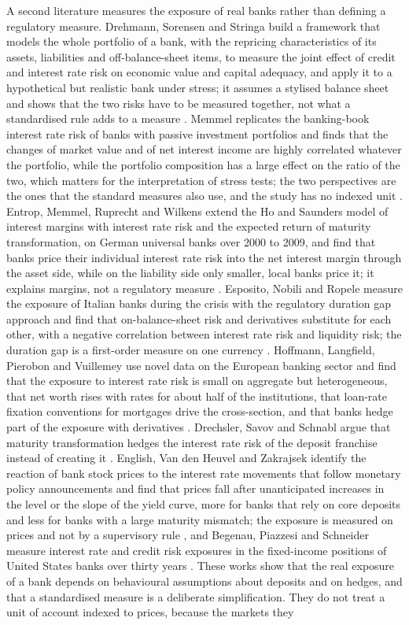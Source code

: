 A second literature measures the exposure of real banks rather than defining a regulatory measure. Drehmann, Sorensen and Stringa build a framework that models the whole portfolio of a bank, with the repricing characteristics of its assets, liabilities and off-balance-sheet items, to measure the joint effect of credit and interest rate risk on economic value and capital adequacy, and apply it to a hypothetical but realistic bank under stress; it assumes a stylised balance sheet and shows that the two risks have to be measured together, not what a standardised rule adds to a measure \citep{Drehmann2010}. Memmel replicates the banking-book interest rate risk of banks with passive investment portfolios and finds that the changes of market value and of net interest income are highly correlated whatever the portfolio, while the portfolio composition has a large effect on the ratio of the two, which matters for the interpretation of stress tests; the two perspectives are the ones that the standard measures also use, and the study has no indexed unit \citep{Memmel2011}. Entrop, Memmel, Ruprecht and Wilkens extend the Ho and Saunders model of interest margins with interest rate risk and the expected return of maturity transformation, on German universal banks over 2000 to 2009, and find that banks price their individual interest rate risk into the net interest margin through the asset side, while on the liability side only smaller, local banks price it; it explains margins, not a regulatory measure \citep{Entrop2015}. Esposito, Nobili and Ropele measure the exposure of Italian banks during the crisis with the regulatory duration gap approach and find that on-balance-sheet risk and derivatives substitute for each other, with a negative correlation between interest rate risk and liquidity risk; the duration gap is a first-order measure on one currency \citep{Esposito2015}. Hoffmann, Langfield, Pierobon and Vuillemey use novel data on the European banking sector and find that the exposure to interest rate risk is small on aggregate but heterogeneous, that net worth rises with rates for about half of the institutions, that loan-rate fixation conventions for mortgages drive the cross-section, and that banks hedge part of the exposure with derivatives \citep{Hoffmann2019}. Drechsler, Savov and Schnabl argue that maturity transformation hedges the interest rate risk of the deposit franchise instead of creating it \citep{Drechsler2021}. English, Van den Heuvel and Zakrajsek identify the reaction of bank stock prices to the interest rate movements that follow monetary policy announcements and find that prices fall after unanticipated increases in the level or the slope of the yield curve, more for banks that rely on core deposits and less for banks with a large maturity mismatch; the exposure is measured on prices and not by a supervisory rule \citep{English2018}, and Begenau, Piazzesi and Schneider measure interest rate and credit risk exposures in the fixed-income positions of United States banks over thirty years \citep{Begenau2015}. These works show that the real exposure of a bank depends on behavioural assumptions about deposits and on hedges, and that a standardised measure is a deliberate simplification. They do not treat a unit of account indexed to prices, because the markets they 